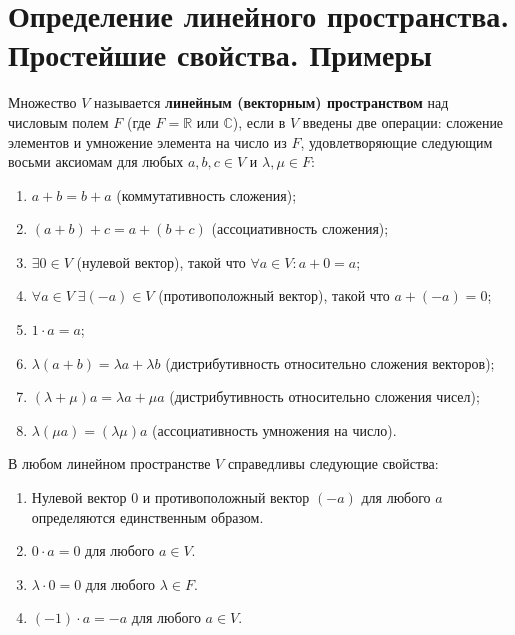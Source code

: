 \section{Определение линейного пространства. Простейшие свойства. Примеры}

\begin{definition}
Множество $V$ называется \textbf{линейным (векторным) пространством} над числовым полем $F$ (где $F = \mathbb{R}$ или $\mathbb{C}$), если в $V$ введены две операции: сложение элементов и умножение элемента на число из $F$, удовлетворяющие следующим восьми аксиомам для любых $a, b, c \in V$ и $\lambda, \mu \in F$:
\begin{enumerate}
    \item $a + b = b + a$ (коммутативность сложения);
    \item $(a + b) + c = a + (b + c)$ (ассоциативность сложения);
    \item $\exists 0 \in V$ (нулевой вектор), такой что $\forall a \in V: a + 0 = a$;
    \item $\forall a \in V \; \exists (-a) \in V$ (противоположный вектор), такой что $a + (-a) = 0$;
    \item $1 \cdot a = a$;
    \item $\lambda(a + b) = \lambda a + \lambda b$ (дистрибутивность относительно сложения векторов);
    \item $(\lambda + \mu)a = \lambda a + \mu a$ (дистрибутивность относительно сложения чисел);
    \item $\lambda(\mu a) = (\lambda\mu)a$ (ассоциативность умножения на число).
\end{enumerate}
\end{definition}

\begin{theorem}
В любом линейном пространстве $V$ справедливы следующие свойства:
\begin{enumerate}
    \item Нулевой вектор $0$ и противоположный вектор $(-a)$ для любого $a$ определяются единственным образом.
    \item $0 \cdot a = 0$ для любого $a \in V$.
    \item $\lambda \cdot 0 = 0$ для любого $\lambda \in F$.
    \item $(-1) \cdot a = -a$ для любого $a \in V$.
\end{enumerate}
\end{theorem}

